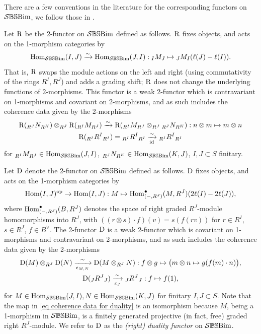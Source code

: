 There are a few conventions in the literature for the corresponding functors on $\SBSBim$, we follow those in \cite[(3.26), (3.48)]{BBE}.     
 

\begin{defn}\label{def reversal symmetry R algebraic}
    Let $\Rev$ be the 2-functor on $\SBSBim$ defined as follows.
    $\Rev$ fixes objects, and acts on the 1-morphism categories by
    $$\Hom_{\SBSBim}(I,J) \xrightarrow{\sim} \Hom_{\SBSBim}(J,I): \Bimod{I}{J}{M} \mapsto \Bimod{J}{I}{M}(\ell(J)-\ell(I)).$$
    That is, $\Rev$ swaps the module actions on the left and right (using commutativity of the rings $R^I, R^J$) and adds a grading shift; $\Rev$ does not change the underlying functions of $2$-morphisms.
    This functor is a weak 2-functor which is contravariant on 1-morphisms and covariant on 2-morphisms, and as such includes the coherence data given by the 2-morphisms
    \begin{gather}
       \Rev(\Bimod{R^J}{R^K}{N})\otimes_{R^J}\Rev(\Bimod{R^I}{R^J}{M}) 
       \xrightarrow{\sim}\Rev(\Bimod{R^I}{R^J}{M} \otimes_{R^J} \Bimod{R^J}{R^K}{N}): n\otimes m \mapsto m\otimes n\\
       \Rev(\Bimod{R^I}{R^I}{R^I})=\Bimod{R^I}{R^I}{R^I} \xrightarrow[\id]{\sim} \Bimod{R^I}{R^I}{R^I}
    \end{gather}
    for $\Bimod{R^I}{R^J}{M} \in \Hom_{\SBSBim}(J,I)$, $\Bimod{R^J}{R^K}{N} \in \Hom_{\SBSBim}(K,J)$, $I,J\subset S$ finitary.
\end{defn}

\begin{defn}\label{def duality symmetry D algebraic}
    Let $\Dual$ denote the 2-functor on $\SBSBim$ defined as follows. 
    $\Dual$ fixes objects, and acts on the 1-morphism categories by
    $$\Hom(I,J)^{\op}\to \Hom(I,J): M \mapsto \Hom^\bullet_{(-,R^J)}(M, R^J)(2\ell(I)-2\ell(J)),$$ 
     where $\Hom^\bullet_{(-,R^J)}(B, R^J)$ denotes the space of right graded $R^J$-module homomorphisms into $R^J$, with $((r \otimes s)\cdot f)(v)=s(f(rv))$ for $r \in R^I$, $s\in R^J$, $f \in B^\vee$.
    The 2-functor $\Dual$ is a weak 2-functor which is covariant on 1-morphisms and contravariant on 2-morphisms, and as such includes the coherence data given by the 2-morphisms 
    \begin{gather}
    \Dual(M)\otimes_{R^J} \Dual(N) \xrightarrow[\epsilon_{M,N}]{\sim} \Dual(M\otimes_{R^J} N): f\otimes g \mapsto \bigl( m \otimes n \mapsto g(f(m)\cdot n) \bigr),\label{eq coherence data for duality}\\
    \Dual(\Bimod{J}{J}{R^J}) \xrightarrow[\varepsilon_J]{\sim} \Bimod{J}{J}{R^J}: f \mapsto f(1), \label{eq coherence data duality identity 1-morphism}
    \end{gather}
    for $M \in \Hom_{\SBSBim}(J,I), N \in \Hom_{\SBSBim}(K,J)$ for finitary $I,J \subset S$. 
    Note that the map in \cref{eq coherence data for duality} is an isomorphism because $M$, being a 1-morphism in $\SBSBim$, is a finitely generated projective (in fact, free) graded right $R^J$-module.
    We refer to $\Dual$ as the \emph{(right) duality functor} on $\SBSBim$.
\end{defn}


